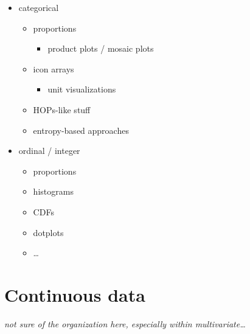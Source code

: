 \documentclass[]{book}
\providecommand{\tightlist}{%
  \setlength{\itemsep}{0pt}\setlength{\parskip}{0pt}}
\theoremstyle{definition}
\theoremstyle{definition}
\theoremstyle{definition}
\theoremstyle{remark}
\begin{document}
\begin{itemize}
\tightlist
\item
  categorical

  \begin{itemize}
  \tightlist
  \item
    proportions

    \begin{itemize}
    \tightlist
    \item
      product plots / mosaic plots
    \end{itemize}
  \item
    icon arrays

    \begin{itemize}
    \tightlist
    \item
      unit visualizations
    \end{itemize}
  \item
    HOPs-like stuff
  \item
    entropy-based approaches
  \end{itemize}
\item
  ordinal / integer

  \begin{itemize}
  \tightlist
  \item
    proportions
  \item
    histograms
  \item
    CDFs
  \item
    dotplots
  \item
    \ldots{}
  \end{itemize}
\end{itemize}

\chapter{Continuous data}\label{ch-continuous}

\emph{not sure of the organization here, especially within
multivariate\ldots{}}
\end{document}
